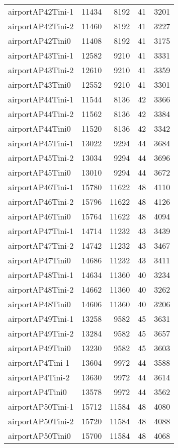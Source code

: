 \begin{longtable}{lrrrr}
airportAP42Tini-1 & 11434 & 8192 & 41 & 3201 \\
airportAP42Tini-2 & 11460 & 8192 & 41 & 3227 \\
airportAP42Tini0 & 11408 & 8192 & 41 & 3175 \\
airportAP43Tini-1 & 12582 & 9210 & 41 & 3331 \\
airportAP43Tini-2 & 12610 & 9210 & 41 & 3359 \\
airportAP43Tini0 & 12552 & 9210 & 41 & 3301 \\
airportAP44Tini-1 & 11544 & 8136 & 42 & 3366 \\
airportAP44Tini-2 & 11562 & 8136 & 42 & 3384 \\
airportAP44Tini0 & 11520 & 8136 & 42 & 3342 \\
airportAP45Tini-1 & 13022 & 9294 & 44 & 3684 \\
airportAP45Tini-2 & 13034 & 9294 & 44 & 3696 \\
airportAP45Tini0 & 13010 & 9294 & 44 & 3672 \\
airportAP46Tini-1 & 15780 & 11622 & 48 & 4110 \\
airportAP46Tini-2 & 15796 & 11622 & 48 & 4126 \\
airportAP46Tini0 & 15764 & 11622 & 48 & 4094 \\
airportAP47Tini-1 & 14714 & 11232 & 43 & 3439 \\
airportAP47Tini-2 & 14742 & 11232 & 43 & 3467 \\
airportAP47Tini0 & 14686 & 11232 & 43 & 3411 \\
airportAP48Tini-1 & 14634 & 11360 & 40 & 3234 \\
airportAP48Tini-2 & 14662 & 11360 & 40 & 3262 \\
airportAP48Tini0 & 14606 & 11360 & 40 & 3206 \\
airportAP49Tini-1 & 13258 & 9582 & 45 & 3631 \\
airportAP49Tini-2 & 13284 & 9582 & 45 & 3657 \\
airportAP49Tini0 & 13230 & 9582 & 45 & 3603 \\
airportAP4Tini-1 & 13604 & 9972 & 44 & 3588 \\
airportAP4Tini-2 & 13630 & 9972 & 44 & 3614 \\
airportAP4Tini0 & 13578 & 9972 & 44 & 3562 \\
airportAP50Tini-1 & 15712 & 11584 & 48 & 4080 \\
airportAP50Tini-2 & 15720 & 11584 & 48 & 4088 \\
airportAP50Tini0 & 15700 & 11584 & 48 & 4068 \\

\end{longtable}
